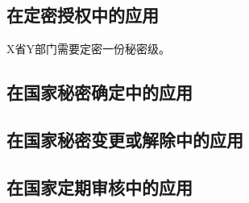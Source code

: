 \subsection{在定密授权中的应用}

X省Y部门需要定密一份秘密级。

\subsection{在国家秘密确定中的应用}
\subsection{在国家秘密变更或解除中的应用}
\subsection{在国家定期审核中的应用}